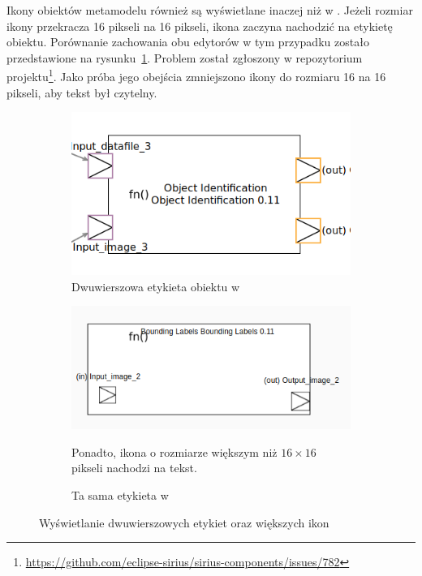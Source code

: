Ikony obiektów metamodelu również są wyświetlane inaczej niż w
\SiriusDesktop{}. Jeżeli rozmiar ikony przekracza 16 pikseli na 16 pikseli,
ikona
zaczyna nachodzić na etykietę obiektu. Porównanie zachowania obu edytorów w
tym przypadku zostało przedstawione na
rysunku~\ref{rys:sirius-multiline-labels}. Problem został zgłoszony w
repozytorium projektu\footnote{
	\url{https://github.com/eclipse-sirius/sirius-components/issues/782}
}. Jako próba jego obejścia zmniejszono ikony do rozmiaru 16 na 16 pikseli, aby
tekst był czytelny.

\begin{figure}
	\centering
	\begin{subfigure}{.49\textwidth}
		\centering
    \includegraphics[width=.8\linewidth]{./images/sirius-desktop-multiline-label.png}
		\caption{Dwuwierszowa etykieta obiektu w \SiriusDesktop{}}
    \vspace{20pt}
	\end{subfigure}
	\begin{subfigure}{.49\textwidth}
		\centering
		\includegraphics[width=.99\linewidth]{./images/sirius-web-multiline-label.png}
		\caption{Ta sama etykieta w \SiriusWeb{}}
    \medskip
    {\footnotesize Ponadto, ikona o rozmiarze większym niż $16\times16$ pikseli nachodzi na tekst.}
	\end{subfigure}

    \caption{Wyświetlanie dwuwierszowych
      etykiet oraz większych ikon}\label{rys:sirius-multiline-labels}
\end{figure}

